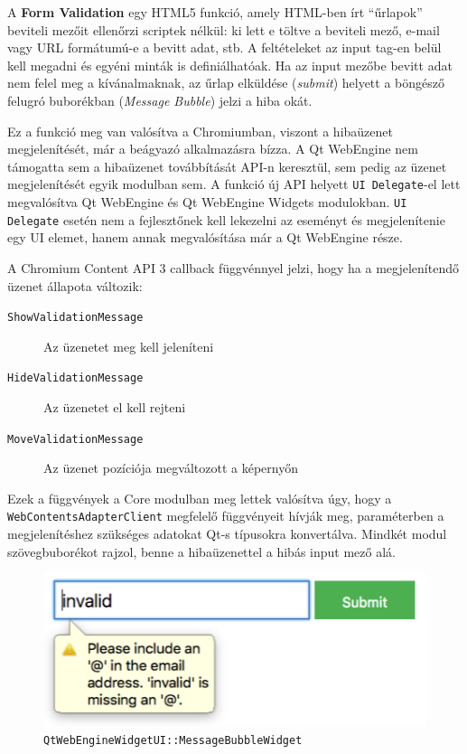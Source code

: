 \documentclass[12pt]{report}
\begin{document}
\noindent
A \textbf{Form Validation} egy HTML5 funkció, amely HTML-ben írt ``űrlapok'' beviteli
mezőit ellenőrzi scriptek nélkül: ki lett e töltve a beviteli mező, e-mail vagy URL
formátumú-e a bevitt adat, stb. A feltételeket az input tag-en belül kell megadni és
egyéni minták is definiálhatóak. Ha az input mezőbe bevitt adat nem felel meg a
kívánalmaknak, az űrlap elküldése (\textit{submit}) helyett a böngésző felugró buborékban
(\textit{Message Bubble}) jelzi a hiba okát.

Ez a funkció meg van valósítva a Chromiumban, viszont a hibaüzenet megjelenítését, már
a beágyazó alkalmazásra bízza. A Qt WebEngine nem támogatta sem a hibaüzenet továbbítását
API-n keresztül, sem pedig az üzenet megjelenítését egyik modulban sem. A funkció új API
helyett \texttt{UI Delegate}-el lett megvalósítva Qt WebEngine és Qt WebEngine Widgets
modulokban. \texttt{UI Delegate} esetén nem a fejlesztőnek kell lekezelni az eseményt és
megjelenítenie egy UI elemet, hanem annak megvalósítása már a Qt WebEngine része.

A Chromium Content API 3 callback függvénnyel jelzi, hogy ha a megjelenítendő üzenet állapota
változik:
\begin{description}
    \item[\texttt{ShowValidationMessage}] Az üzenetet meg kell jeleníteni
    \item[\texttt{HideValidationMessage}] Az üzenetet el kell rejteni
    \item[\texttt{MoveValidationMessage}] Az üzenet pozíciója megváltozott a képernyőn
\end{description}
Ezek a függvények a Core modulban meg lettek valósítva úgy, hogy a \\
\texttt{WebContentsAdapterClient} megfelelő függvényeit hívják meg, paraméterben
a megjelenítéshez szükséges adatokat Qt-s típusokra konvertálva. Mindkét modul
szövegbuborékot rajzol, benne a hibaüzenettel a hibás input mező alá.

\begin{figure}[h]
    \centering
    \includegraphics[scale=0.75]{bubi-widget-screenshot}
    \caption{
        \label{fig:bubi-widget-screenshot}
        \texttt{QtWebEngineWidgetUI::MessageBubbleWidget}
    }
\end{figure}
\end{document}
